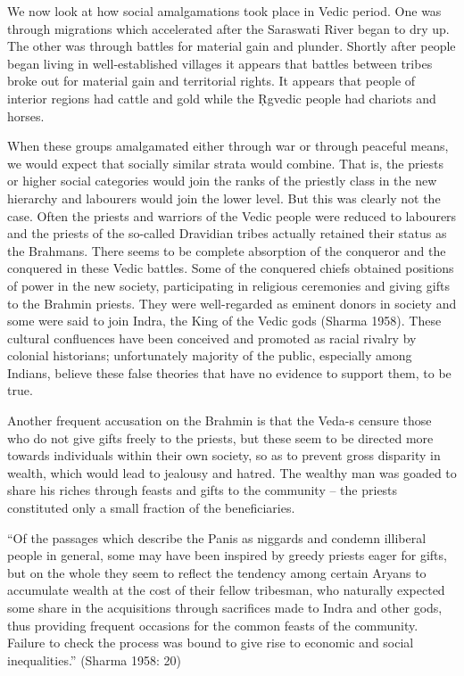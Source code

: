 We now look at how social amalgamations took place in Vedic period. One was through migrations which accelerated after the Saraswati River began to dry up. The other was through battles for material gain and plunder. Shortly after people began living in well-established villages it appears that battles between tribes broke out for material gain and territorial rights. It appears that people of interior regions had cattle and gold while the Ṛgvedic people had chariots and horses. 

When these groups amalgamated either through war or through peaceful means, we would expect that socially similar strata would combine. That is, the priests or higher social categories would join the ranks of the priestly class in the new hierarchy and labourers would join the lower level. But this was clearly not the case. Often the priests and warriors of the Vedic people were reduced to labourers and the priests of the so-called Dravidian tribes actually retained their status as the Brahmans. There seems to be complete absorption of the conqueror and the conquered in these Vedic battles. Some of the conquered chiefs obtained positions of power in the new society, participating in religious ceremonies and giving gifts to the Brahmin priests. They were well-regarded as eminent donors in society and some were said to join Indra, the King of the Vedic gods (Sharma 1958). These cultural confluences have been conceived and promoted as racial rivalry by colonial historians; unfortunately majority of the public, especially among Indians, believe these false theories that have no evidence to support them, to be true.

Another frequent accusation on the Brahmin is that the Veda-s censure those who do not give gifts freely to the priests, but these seem to be directed more towards individuals within their own society, so as to prevent gross disparity in wealth, which would lead to jealousy and hatred. The wealthy man was goaded to share his riches through feasts and gifts to the community – the priests constituted only a small fraction of the beneficiaries.

\begin{myquote}
“Of the passages which describe the Panis as niggards and condemn illiberal people in general, some may have been inspired by greedy priests eager for gifts, but on the whole they seem to reflect the tendency among certain Aryans to accumulate wealth at the cost of their fellow tribesman, who naturally expected some share in the acquisitions through sacrifices made to Indra and other gods, thus providing frequent occasions for the common feasts of the community. Failure to check the process was bound to give rise to economic and social inequalities.” (Sharma 1958: 20)
\end{myquote}


